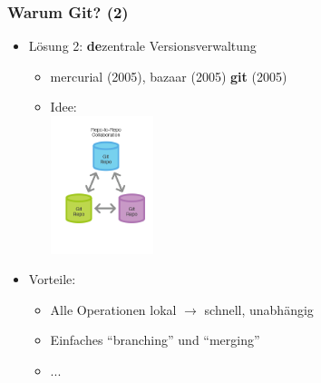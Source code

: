 \documentclass{beamer}
\begin{document}
\begin{frame}[label=why30]
\frametitle{Warum Git? (2)}

\begin{itemize}
  \item Lösung 2: \textbf{de}zentrale Versionsverwaltung
  \begin{itemize}
   \item mercurial (2005), bazaar (2005) \textbf{git} (2005)
   \item Idee:\\[-2mm]
   \hspace{2cm}\includegraphics[width=30mm]{img-src/structure-git1}
  \end{itemize}
  \item Vorteile:
  \begin{itemize}
   \item Alle Operationen lokal $\rightarrow$ schnell, unabhängig
   \item Einfaches "`branching"' und "`merging"'
   \item ...
  \end{itemize}
  \end{itemize}
\end{frame}
\end{document}
